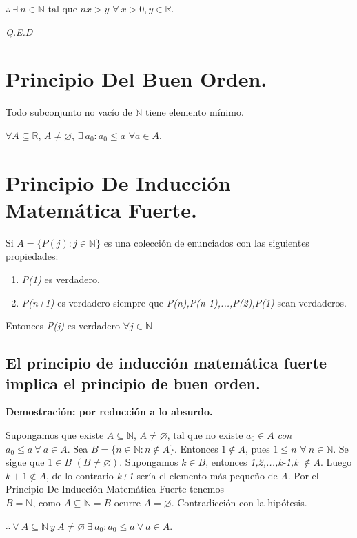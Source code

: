 \documentclass{book}
\begin{document}
$\therefore \ \exists \ n\in{\mathbb{N}}\mbox{ tal que }nx>y$ $\forall \  x>0,y\in{\mathbb{R}}$.

\textit{Q.E.D}

\section{Principio Del Buen Orden.}

Todo subconjunto no vacío de $\mathbb{N}$ tiene elemento mínimo.

$\forall A\subseteq{\mathbb{R}}$, $ A\neq \varnothing$, $\exists \  a_0 :a_0 \le a$ $ \forall a\in{A}$.

\section{Principio De Inducción Matemática Fuerte.}

Si $A=\lbrace P(j):j\in{\mathbb{N}}\rbrace$ es una colección de enunciados con las siguientes propiedades:
\begin{enumerate}[1.]
\item \textit{P(1)} es verdadero.
\item \textit{P(n+1)} es verdadero siempre que \textit{P(n),P(n-1),...,P(2),P(1)} sean verdaderos.
\end{enumerate}
Entonces \textit{P(j)} es verdadero $\forall j\in{\mathbb{N}}$

\subsection{El principio de inducción matemática fuerte implica el principio de buen orden.}

\textbf{Demostración: por reducción a lo absurdo.}

Supongamos que existe $A\subseteq \mathbb{N}$, $A\neq \varnothing$, tal que no existe $a_0\in A$ \textit{ con } $a_0\le{a} \ \forall \ a\in{A}$.
Sea $B=\lbrace n\in{\mathbb{N}}:n\notin{A} \rbrace$. Entonces $1\notin{A}$, pues $ 1\le{n}$ $\forall \ n\in{\mathbb{N}}$.
Se sigue que $1\in{B}$ $(B\neq \varnothing)$.
Supongamos $k\in{B}$, entonces \textit{1,2,...,k-1,k} $\notin{A}$.
Luego $k+1\notin{A}$, de lo contrario \textit{k+1} sería el elemento más pequeño de \textit{A}.
Por el Principio De Inducción Matemática Fuerte tenemos $B=\mathbb{N}\mbox{, como }A\subseteq{\mathbb{N}}=B\mbox{ ocurre }A=\varnothing$.
Contradicción con la hipótesis.

$\therefore \ \forall \ A\subseteq{\mathbb{N}} \ y \ A\neq{\varnothing} \ \exists \ a_0:a_0\le{a} \ \forall \ a\in{A}$.
\end{document}
